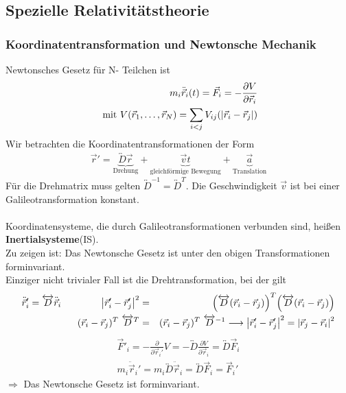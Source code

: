\subsection{Spezielle Relativitätstheorie}
\subsubsection{Koordinatentransformation und Newtonsche Mechanik}
Newtonsches Gesetz für N- Teilchen ist
\begin{eqnarray*}
m_i\ddot{\vec r}_i(t) = \vec F_i = - \frac{\partial V}{\partial \vec r_i}\\
\text{ mit }V(\vec r_1 , \dots, \vec r_N) = \sum \limits_{i<j} V_{ij}(\left|\vec r_i-\vec r_j\right|)
\end{eqnarray*}
Wir betrachten die Koordinatentransformationen der Form
\begin{eqnarray*}\label{eq1}
\vec r' = \underbrace{\overleftrightarrow D \vec r}_{\text{Drehung}} + \underbrace{\vec vt}_{\text{gleichförmige Bewegung}} + \underbrace{\vec a}_{\text{Translation}}
\end{eqnarray*}
Für die Drehmatrix muss gelten $\overleftrightarrow D^{-1} = \overleftrightarrow D^T$. Die Geschwindigkeit $\vec{v}$ ist bei einer Galileotransformation konstant.\\ \\


Koordinatensysteme, die durch Galileotransformationen verbunden sind, heißen {\bf Inertialsysteme}(IS).\\

Zu zeigen ist: Das Newtonsche Gesetz ist unter den obigen Transformationen forminvariant.\\
Einziger nicht trivialer Fall ist die Drehtransformation, bei der gilt
\begin{eqnarray*}
\ddot{\vec r}_i' = \overleftrightarrow D\ddot{\vec r}_i \qquad \qquad
\left|\vec r'_i-\vec r'_j\right|^2 &=& \Big(\overleftrightarrow D(\vec
  r_i-\vec r_j)\Big)^T \Big (\overleftrightarrow D(\vec r_i-\vec
  r_j)\Big)\\ 
(\vec r_i-\vec r_j)^T \ \overleftrightarrow D^T &=& (\vec r_i-\vec
r_j)^T \ \overleftrightarrow D^{-1} \longrightarrow \left|\vec
  r'_i-\vec r'_j \right|^2 = \left|\vec r_j-\vec r_i\right|^2\\ 
\end{eqnarray*}
\begin{eqnarray*}
\vec F'_i = -\frac {\partial}{\partial \vec r_i'}V = -
\overleftrightarrow D\frac{\partial V}{\partial \vec r_i} =
\overleftrightarrow D\vec F_i\\ 
m_i\ddot{\vec r}_i' = m_i \overleftrightarrow D\ddot{\vec r}_i =
\overleftrightarrow D \vec F_i = \vec F_i' 
\end{eqnarray*}
$\Longrightarrow$ Das Newtonsche Gesetz ist forminvariant.
\\
\\


